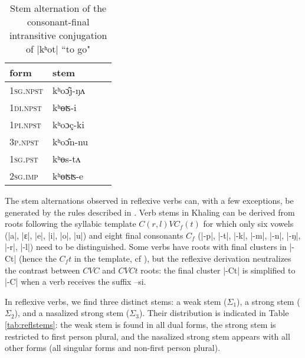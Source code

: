 \documentclass[twoside,a4paper,11pt]{article}
\newcommand{\ipa}[1]{{\phon#1}}
\newcommand{\ra}{$\Sigma_1$}
\newcommand{\rbb}{$\Sigma_2$}
\newcommand{\rc}{$\Sigma_3$}
\begin{document}
\begin{table}[H]
\caption{Stem alternation of  the consonant-final intransitive conjugation  of |\ipa{kʰot}| ``to go"} \label{tab:khot} \centering
\begin{tabular}{llll}
\toprule
form&stem\\
\midrule
\textsc{1sg.npst}&\ipa{kʰoɔ̂j-ŋʌ} \\
\textsc{1di.npst}&\ipa{kʰɵʦ-i} \\
\textsc{1pi.npst}&\ipa{kʰoɔç-ki} \\
\textsc{3p.npst}&\ipa{kʰoɔ̂n-nu} \\
\textsc{1sg.pst}&\ipa{kʰɵs-tʌ} \\
\textsc{2sg.imp}&\ipa{kʰɵʦʦ-e} \\
\bottomrule
\end{tabular}
\end{table}

The stem  alternations observed in reflexive verbs can, with a few exceptions, be generated by the rules  described in  \citet[1108-1111]{jacques12khaling}. Verb stems in Khaling can be derived from roots following the syllabic template $C(r,l)VC_f(t)$ for which only six vowels (|a|, |ɛ|, |e|, |i|, |o|, |u|) and eight final consonants $C_f$ (|-p|, |-t|, |-k|, |-m|, |-n|, |-ŋ|, |-r|, |-l|) need to be distinguished. Some verbs have roots with final clusters in |-Ct| (hence the $C_ft$ in the template, cf \citealt[1119-1122]{jacques12khaling}), but the reflexive derivation neutralizes the contrast between $CVC$ and $CVCt$ roots: the final cluster |-Ct| is simplified to |-C| when a verb receives the suffix --\ipa{si}.

In reflexive verbs, we find three distinct stems: a weak stem (\ra{}), a strong stem (\rbb{}), and a nasalized strong stem (\rc{}). Their distribution is indicated in Table \ref{tab:reflstems}: 
the weak stem is found in all dual forms, the strong stem is restricted to first person plural, and the nasalized strong stem appears with all other forms (all singular forms and non-first person plural).
\end{document}
